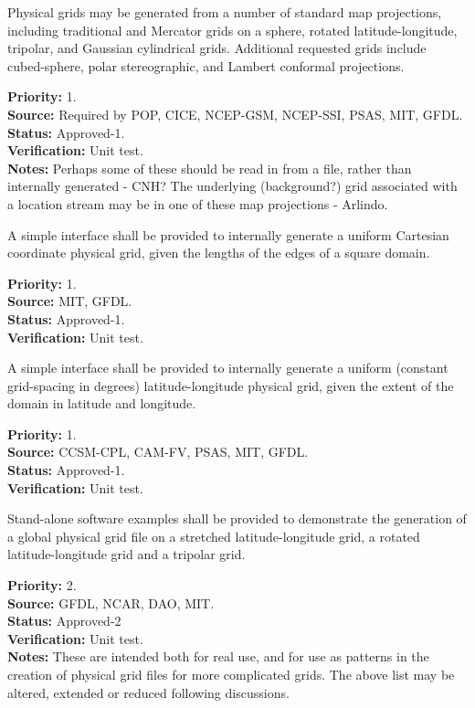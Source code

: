 
Physical grids may be generated from a number of standard map projections, including
traditional and Mercator grids on a sphere, rotated latitude-longitude,
tripolar, and Gaussian cylindrical grids.  Additional requested grids include 
cubed-sphere, polar stereographic, and Lambert conformal projections.
\begin{reqlist}
{\bf Priority:} 1. \\
{\bf Source:} Required by POP, CICE, NCEP-GSM, NCEP-SSI,
PSAS, MIT, GFDL. \\
{\bf Status:} Approved-1. \\
{\bf Verification:} Unit test.\\
{\bf Notes:}  Perhaps some of these should be read in from a file, rather than
internally generated - CNH?  The underlying (background?) grid associated with a location stream may be in one of these map projections - Arlindo.
\end{reqlist}

A simple interface shall be provided to internally generate a uniform Cartesian
coordinate physical grid, given the lengths of the edges of a square domain.
\begin{reqlist}
{\bf Priority:} 1. \\
{\bf Source:} MIT, GFDL. \\
{\bf Status:} Approved-1. \\
{\bf Verification:} Unit test. 
\end{reqlist}

A simple interface shall be provided to internally generate a uniform (constant
grid-spacing in degrees) latitude-longitude physical grid, given the extent of the domain
in latitude and longitude.                                                           
\begin{reqlist}
{\bf Priority:} 1. \\
{\bf Source:} CCSM-CPL, CAM-FV, PSAS, MIT, GFDL. \\
{\bf Status:} Approved-1. \\
{\bf Verification:} Unit test.
\end{reqlist}

Stand-alone software examples shall be provided to demonstrate the generation of a
global physical grid file on a stretched latitude-longitude grid, a rotated
latitude-longitude grid and a tripolar grid. 
\begin{reqlist}
{\bf Priority:} 2. \\
{\bf Source:} GFDL, NCAR, 
DAO, MIT. \\
{\bf Status:} Approved-2 \\
{\bf Verification:} Unit test.\\
{\bf Notes:} These are intended both for real use, and for use as patterns in the
creation of physical grid files for more complicated grids.  The above list may be
altered, extended or reduced following discussions.
\end{reqlist}

